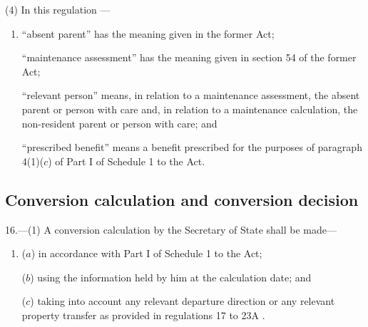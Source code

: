 \documentclass[12pt,a4paper]{article}
\begin{document}
(4) In 
this regulation%
—
\begin{enumerate}\item[]
“absent parent” has the meaning given in the former Act;

“maintenance assessment” has the meaning given in section 54 of the former Act;

    “relevant person” means, in relation to a maintenance assessment, the absent parent
or person with care and, in relation to a maintenance calculation, the non-resident parent or person with care; and

    “prescribed benefit” means a benefit prescribed for the purposes of paragraph 4(1)($c$)  of Part I of Schedule 1 to the Act. 
\end{enumerate}


\subsection[16. Conversion calculation and conversion decision]{Conversion calculation and conversion decision}

16.---(1)  A conversion calculation by the Secretary of State shall be made—
\begin{enumerate}\item[]
($a$) in accordance with Part I of Schedule 1 to the Act;

($b$) using the information held by him at the calculation date; and

($c$) taking into account any relevant departure direction or any relevant property transfer as provided in regulations 17 to 
23A%
.
\end{enumerate}
\end{document}
